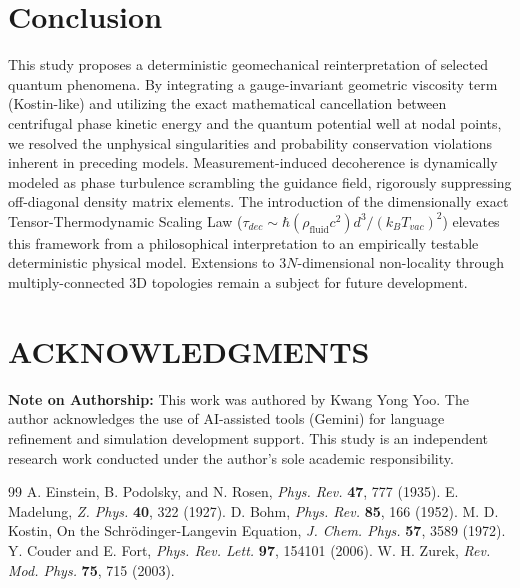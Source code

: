 \documentclass[reprint,amsmath,amssymb,aps,prd]{revtex4-2}
\begin{document}
\section{Conclusion}
This study proposes a deterministic geomechanical reinterpretation of selected quantum phenomena.
By integrating a gauge-invariant geometric viscosity term (Kostin-like) and utilizing the exact mathematical cancellation between centrifugal phase kinetic energy and the quantum potential well at nodal points, we resolved the unphysical singularities and probability conservation violations inherent in preceding models.
Measurement-induced decoherence is dynamically modeled as phase turbulence scrambling the guidance field, rigorously suppressing off-diagonal density matrix elements.
The introduction of the dimensionally exact Tensor-Thermodynamic Scaling Law ($\tau_{dec} \sim \hbar (\rho_{\mathrm{fluid}} c^2) d^3 / (k_B T_{vac})^2$) elevates this framework from a philosophical interpretation to an empirically testable deterministic physical model.
Extensions to $3N$-dimensional non-locality through multiply-connected 3D topologies remain a subject for future development.

\section*{ACKNOWLEDGMENTS}
\textbf{Note on Authorship:} This work was authored by Kwang Yong Yoo. The author acknowledges the use of AI-assisted tools (Gemini) for language refinement and simulation development support. This study is an independent research work conducted under the author's sole academic responsibility.

\begin{thebibliography}{99}
 A. Einstein, B. Podolsky, and N. Rosen, \textit{Phys. Rev.} \textbf{47}, 777 (1935).
 E. Madelung, \textit{Z. Phys.} \textbf{40}, 322 (1927).
 D. Bohm, \textit{Phys. Rev.} \textbf{85}, 166 (1952).
 M. D. Kostin, On the Schrödinger-Langevin Equation, \textit{J. Chem. Phys.} \textbf{57}, 3589 (1972).
 Y. Couder and E. Fort, \textit{Phys. Rev. Lett.} \textbf{97}, 154101 (2006).
 W. H. Zurek, \textit{Rev. Mod. Phys.} \textbf{75}, 715 (2003).
\end{thebibliography}
\end{document}
